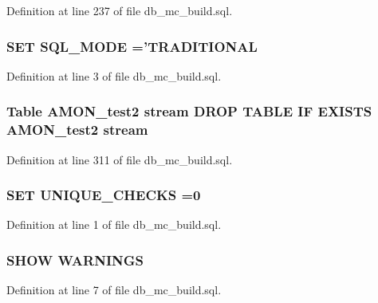 Definition at line 237 of file db\-\_\-mc\-\_\-build.\-sql.

\hypertarget{db__mc__build_8sql_a330bb31afceaa2ed02fe330e68e347c1}{
\subsubsection[{S\-Q\-L\-\_\-\-M\-O\-D\-E}]{\setlength{\rightskip}{0pt plus 5cm}S\-E\-T S\-Q\-L\-\_\-\-M\-O\-D\-E ='T\-R\-A\-D\-I\-T\-I\-O\-N\-A\-L}}\label{db__mc__build_8sql_a330bb31afceaa2ed02fe330e68e347c1}


Definition at line 3 of file db\-\_\-mc\-\_\-build.\-sql.

\hypertarget{db__mc__build_8sql_a4982435d1ddbb5e156786ba88ae7c71e}{
\subsubsection[{stream}]{\setlength{\rightskip}{0pt plus 5cm}Table {\bf A\-M\-O\-N\-\_\-test2} stream D\-R\-O\-P T\-A\-B\-L\-E I\-F E\-X\-I\-S\-T\-S {\bf A\-M\-O\-N\-\_\-test2} stream}}\label{db__mc__build_8sql_a4982435d1ddbb5e156786ba88ae7c71e}


Definition at line 311 of file db\-\_\-mc\-\_\-build.\-sql.

\hypertarget{db__mc__build_8sql_a925de1b16b086a8c891972b8650dd849}{
\subsubsection[{U\-N\-I\-Q\-U\-E\-\_\-\-C\-H\-E\-C\-K\-S}]{\setlength{\rightskip}{0pt plus 5cm}S\-E\-T U\-N\-I\-Q\-U\-E\-\_\-\-C\-H\-E\-C\-K\-S =0}}\label{db__mc__build_8sql_a925de1b16b086a8c891972b8650dd849}


Definition at line 1 of file db\-\_\-mc\-\_\-build.\-sql.

\hypertarget{db__mc__build_8sql_a130401f26b798bc83d6bd014ad42afdc}{
\subsubsection[{W\-A\-R\-N\-I\-N\-G\-S}]{\setlength{\rightskip}{0pt plus 5cm}S\-H\-O\-W W\-A\-R\-N\-I\-N\-G\-S}}\label{db__mc__build_8sql_a130401f26b798bc83d6bd014ad42afdc}


Definition at line 7 of file db\-\_\-mc\-\_\-build.\-sql.

